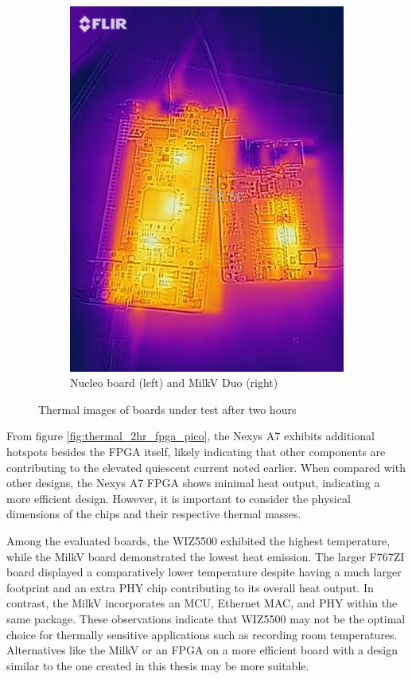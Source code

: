 \begin{figure}[h]
\begin{subfigure}[b]{0.45\textwidth}
        \includegraphics[width=\textwidth]{Images/flir_nucleo_milkv.jpg}
        \caption{Nucleo board (left) and MilkV Duo (right)}
        \label{fig:thermal_2hr_nucleo_milkv}
    \end{subfigure}
    \caption{Thermal images of boards under test after two hours}
    \label{fig:thermal_2hr}
\end{figure}



From figure \ref{fig:thermal_2hr_fpga_pico}, the Nexys A7 exhibits additional hotspots besides the FPGA itself, likely indicating that other components are contributing to the elevated quiescent current noted earlier. When compared with other designs, the Nexys A7 FPGA shows minimal heat output, indicating a more efficient design. However, it is important to consider the physical dimensions of the chips and their respective thermal masses.

Among the evaluated boards, the WIZ5500 exhibited the highest temperature, while the MilkV board demonstrated the lowest heat emission. The larger F767ZI board displayed a comparatively lower temperature despite having a much larger footprint and an extra PHY chip contributing to its overall heat output. In contrast, the MilkV incorporates an MCU, Ethernet MAC, and PHY within the same package. These observations indicate that WIZ5500 may not be the optimal choice for thermally sensitive applications such as recording room temperatures. Alternatives like the MilkV or an FPGA on a more efficient board with a design similar to the one created in this thesis may be more suitable.

